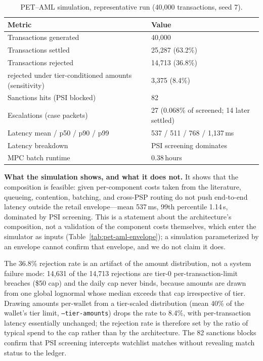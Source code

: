 \documentclass[11pt]{article}
\begin{document}
\begin{table}[H]
\centering
\caption{PET--AML simulation, representative run (40{,}000 transactions, seed 7).}
\label{tab:sim-results}
\begin{tabular}{p{6.4cm} p{3.4cm}}
\toprule
\textbf{Metric} & \textbf{Value} \\
\midrule
Transactions generated       & 40{,}000 \\
Transactions settled         & 25{,}287 (63.2\%) \\
Transactions rejected        & 14{,}713 (36.8\%) \\
\quad rejected under tier-conditioned amounts (sensitivity) & 3{,}375 (8.4\%) \\
Sanctions hits (PSI blocked) & 82 \\
Escalations (case packets)   & 27 (0.068\% of screened; 14 later settled) \\
\addlinespace
Latency mean / p50 / p90 / p99 & 537 / 511 / 768 / 1{,}137\,ms \\
Latency breakdown            & PSI screening dominates \\
MPC batch runtime            & 0.38\,hours \\
\bottomrule
\end{tabular}
\end{table}

\textbf{What the simulation shows, and what it does not.} It shows that the composition is feasible:
given per-component costs taken from the literature, queueing, contention, batching, and cross-PSP
routing do not push end-to-end latency outside the retail envelope---mean 537\,ms, 99th percentile
1.14\,s, dominated by PSI screening. This is a statement about the architecture's composition, not a
validation of the component costs themselves, which enter the simulator as inputs
(Table~\ref{tab:pet-aml-envelope}); a simulation parameterized by an envelope cannot confirm that
envelope, and we do not claim it does.

The 36.8\% rejection rate is an artifact of the amount distribution, not a system failure mode:
14{,}631 of the 14{,}713 rejections are tier-0 per-transaction-limit breaches (\$50 cap) and the daily
cap never binds, because amounts are drawn from one global lognormal whose median exceeds that cap
irrespective of tier. Drawing amounts per-wallet from a tier-scaled distribution (mean 40\% of the
wallet's tier limit, \texttt{--tier-amounts}) drops the rate to 8.4\%, with per-transaction latency
essentially unchanged; the rejection rate is therefore set by the ratio of typical spend to the cap
rather than by the architecture. The 82 sanctions blocks confirm that PSI screening intercepts
watchlist matches without revealing match status to the ledger.
\end{document}
